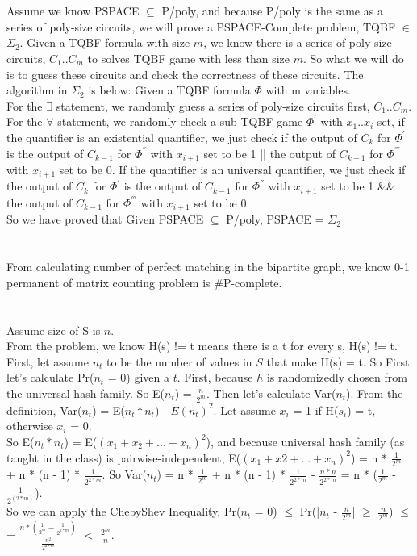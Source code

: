 \documentclass[11pt]{article}
\begin{document}
\part{}
Assume we know PSPACE $\subseteq$ P/poly, and because P/poly is the same as a series of poly-size circuits, we will prove a PSPACE-Complete problem, TQBF $\in$ $\Sigma_{2}$. Given a TQBF formula with size $m$, we know there is a series of poly-size circuits, $C_{1}..C_{m}$ to solves TQBF game with less than size $m$. So what we will do is to guess these circuits and check the correctness of these circuits. The algorithm in $\Sigma_{2}$ is below:
Given a TQBF formula $\Phi$ with m variables. \\
For the $\exists$ statement, we randomly guess a series of poly-size circuits first, $C_{1}..C_{m}$. \\
For the $\forall$ statement, we randomly check a sub-TQBF game $\Phi^{'}$ with $x_{1}..x_{i}$ set, if the quantifier is an existential quantifier, we just check if the output of $C_{k}$ for $\Phi^{'}$ is 
the output of $C_{k-1}$ for $\Phi^{''}$ with $x_{i+1}$ set to be 1 || the output of $C_{k-1}$ for $\Phi^{'''}$ with $x_{i+1}$ set to be 0. If the quantifier is an universal quantifier, we just check if the output of $C_{k}$ for $\Phi^{'}$ is the output of $C_{k-1}$ for $\Phi^{''}$ with $x_{i+1}$ set to be 1 \&\& the output of $C_{k-1}$ for $\Phi^{'''}$ with $x_{i+1}$ set to be 0. \\
So we have proved that Given PSPACE $\subseteq$ P/poly, PSPACE = $\Sigma_{2}$
\part{}
From calculating number of perfect matching in the bipartite graph, we know 0-1 permanent of matrix counting problem is \#P-complete.
\part{}
Assume size of S is $n$. \\
From the problem, we know H(s) != t means there is a t for every s, H(s) != t. First, let assume $n_{t}$ to be the number of values in $S$ that make H(s) = t. So First let's calculate Pr($n_{t}$ = 0) given a $t$. First, because $h$ is randomizedly chosen from the universal hash family. So E($n_{t}$) = $\frac{n}{2^{m}}$. Then let's calculate Var($n_{t}$). From the definition, Var($n_{t}$) = E($n_{t}*n_{t}$) - $E(n_{t})^{2}$. Let assume $x_{i}$ = 1 if H($s_{i}$) = t, otherwise $x_{i}$ = 0. \\
So E($n_{t}*n_{t}$) = E($(x_{1} + x_{2} + ... + x_{n})^{2}$), and because universal hash family (as taught in the class) is pairwise-independent, E($(x_{1} + x{2} + ... + x_{n})^{2}$) = n * $\frac{1}{2^{m}}$ + n * (n - 1) * $\frac{1}{2^{2*m}}$. So Var($n_{t}$) = n * $\frac{1}{2^{m}}$ + n * (n - 1) * $\frac{1}{2^{2*m}}$ - $\frac{n * n}{2^{2 * m}}$ = n * ($\frac{1}{2^{m}}$ - $\frac{1}{2^(2*m)}$). \\ 
So we can apply the ChebyShev Inequality, Pr($n_{t}$ = 0) $\leq$ Pr(|$n_{t}$ - $\frac{n}{2^{m}}$| $\geq$ $\frac{n}{2^{m}}$) $\leq$ = $\frac{n * (\frac{1}{2^{m}} - \frac{1}{2^{2*m}})}{\frac{n^{2}}{2^{2*m}}}$ $\leq$ $\frac{2^{m}}{n}$. \\
\end{document}

